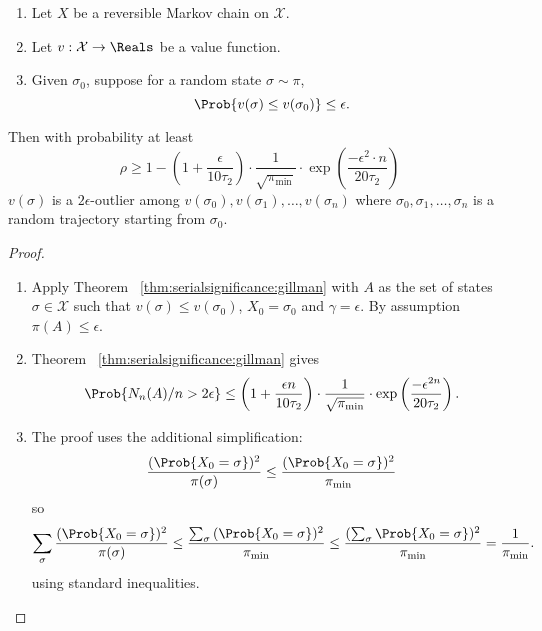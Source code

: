\documentclass[12pt]{article}
\begin{document}
\begin{theorem}
    \label{thm:serialsignificance:powerthm}
    \begin{enumerate}
        \item
            Let \( X \) be a reversible Markov chain on \( \mathcal{X} \).
        \item
            Let \( v :  \mathcal{X} \to \Reals \) be a value function.
        \item
            Given \( \sigma_0 \), suppose for a random state \( \sigma
            \sim \pi \),
            \[
                \Prob{v(\sigma) \le v(\sigma_0)} \le \epsilon.
            \]
    \end{enumerate}
    Then with probability at least
    \[
        \rho \ge 1 - \left( 1 + \frac{\epsilon}{10 \tau_2} \right) \cdot
        \frac{1}{\sqrt{\pi_{\min}}} \cdot \exp \left( \frac {-\epsilon^
        {2} \cdot n}{20 \tau_{2}} \right)
    \] \( v(\sigma) \) is a \( 2\epsilon \)-outlier among \( v(\sigma_0),
    v(\sigma_1), \dots, v(\sigma_n) \) where \( \sigma_0, \sigma_1,
    \dots, \sigma_n \) is a random trajectory starting from \( \sigma_0 \).
\end{theorem}

\begin{proof}
    \begin{enumerate}
        \item
            Apply Theorem~%
            \ref{thm:serialsignificance:gillman} with \( A \) as the set of
            states \( \sigma \in \mathcal{X} \) such that \( v(\sigma)
            \le v(\sigma_0) \), \( X_0 = \sigma_0 \) and \( \gamma =
            \epsilon \).  By assumption \( \pi(A) \le \epsilon \).
        \item
            Theorem~%
            \ref{thm:serialsignificance:gillman} gives
            \[
                \Prob{N_{n}(A)/n > 2\epsilon} \le \left( 1 + \frac{\epsilon
                n}{10 \tau_2} \right) \cdot \frac{1}{\sqrt{\pi_{\min}}}
                \cdot \exp \left( \frac{-\epsilon^{2 n}}{20 \tau_2}
                \right).
            \]
        \item
            The  proof uses the additional
            simplification:
            \[
                \frac{(\Prob{X_0 = \sigma})^2}{\pi (\sigma)} \le \frac{(\Prob
                {X_0 = \sigma})^2}{\pi_{\min}}
            \] so
            \[
                \sum_{\sigma} \frac{(\Prob{X_0 =\sigma})^2}{\pi (\sigma)}
                \le \frac{\sum_{\sigma}{(\Prob{X_0 =\sigma})^2}}{\pi_{\min}}
                \le \frac{(\sum_{\sigma}\Prob{X_0 =\sigma})^2}{\pi_{\min}}
                = \frac{1}{\pi_{\min}}.
            \] using standard inequalities.
    \end{enumerate}
\end{proof}
\end{document}
